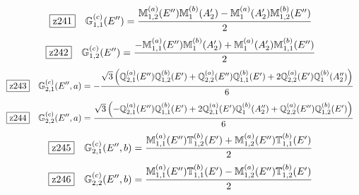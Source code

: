 \documentclass[fleqn,10pt,landscape]{jsarticle}
\begin{document}
\begin{dmath*}
\hspace*{3mm}\fbox{z241}\quad \mathbb{G}_{1,1}^{(c)}(E^{\prime\prime})=\frac{\mathbb{M}_{1,2}^{(a)}(E^{\prime\prime}) \mathbb{M}_{1}^{(b)}(A_{2}^{\prime}) - \mathbb{M}_{1}^{(a)}(A_{2}^{\prime}) \mathbb{M}_{1,2}^{(b)}(E^{\prime\prime})}{2}
\end{dmath*}
\begin{dmath*}
\hspace*{3mm}\fbox{z242}\quad \mathbb{G}_{1,2}^{(c)}(E^{\prime\prime})=\frac{- \mathbb{M}_{1,1}^{(a)}(E^{\prime\prime}) \mathbb{M}_{1}^{(b)}(A_{2}^{\prime}) + \mathbb{M}_{1}^{(a)}(A_{2}^{\prime}) \mathbb{M}_{1,1}^{(b)}(E^{\prime\prime})}{2}
\end{dmath*}
\begin{dmath*}
\hspace*{3mm}\fbox{z243}\quad \mathbb{G}_{2,1}^{(c)}(E^{\prime\prime},a)=- \frac{\sqrt{3} \left(\mathbb{Q}_{2,1}^{(a)}(E^{\prime\prime}) \mathbb{Q}_{1,2}^{(b)}(E^{\prime}) + \mathbb{Q}_{2,2}^{(a)}(E^{\prime\prime}) \mathbb{Q}_{1,1}^{(b)}(E^{\prime}) + 2 \mathbb{Q}_{2,2}^{(a)}(E^{\prime}) \mathbb{Q}_{1}^{(b)}(A_{2}^{\prime\prime})\right)}{6}
\end{dmath*}
\begin{dmath*}
\hspace*{3mm}\fbox{z244}\quad \mathbb{G}_{2,2}^{(c)}(E^{\prime\prime},a)=\frac{\sqrt{3} \left(- \mathbb{Q}_{2,1}^{(a)}(E^{\prime\prime}) \mathbb{Q}_{1,1}^{(b)}(E^{\prime}) + 2 \mathbb{Q}_{2,1}^{(a)}(E^{\prime}) \mathbb{Q}_{1}^{(b)}(A_{2}^{\prime\prime}) + \mathbb{Q}_{2,2}^{(a)}(E^{\prime\prime}) \mathbb{Q}_{1,2}^{(b)}(E^{\prime})\right)}{6}
\end{dmath*}
\begin{dmath*}
\hspace*{3mm}\fbox{z245}\quad \mathbb{G}_{2,1}^{(c)}(E^{\prime\prime},b)=\frac{\mathbb{M}_{1,1}^{(a)}(E^{\prime\prime}) \mathbb{T}_{1,2}^{(b)}(E^{\prime}) + \mathbb{M}_{1,2}^{(a)}(E^{\prime\prime}) \mathbb{T}_{1,1}^{(b)}(E^{\prime})}{2}
\end{dmath*}
\begin{dmath*}
\hspace*{3mm}\fbox{z246}\quad \mathbb{G}_{2,2}^{(c)}(E^{\prime\prime},b)=\frac{\mathbb{M}_{1,1}^{(a)}(E^{\prime\prime}) \mathbb{T}_{1,1}^{(b)}(E^{\prime}) - \mathbb{M}_{1,2}^{(a)}(E^{\prime\prime}) \mathbb{T}_{1,2}^{(b)}(E^{\prime})}{2}
\end{dmath*}
\vspace{5mm}
\end{document}
